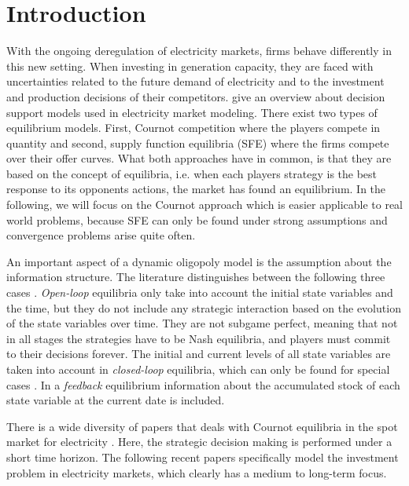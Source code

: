 \section{Introduction}

With the ongoing deregulation of electricity markets, firms behave differently in this new setting. When investing in generation capacity, they are faced with uncertainties related to the future demand of electricity and to the investment and production decisions of their competitors. \cite{Ventosa2005} give an overview about decision support models used in electricity market modeling. There exist two types of equilibrium models. First, Cournot competition where the players compete in quantity and second, supply function equilibria (SFE) where the firms compete over their offer curves. What both approaches have in common, is that they are based on the concept of \cite{Nash1951} equilibria, i.e. when each players strategy is the best response to its opponents actions, the market has found an equilibrium. In the following, we will focus on the Cournot approach which is easier applicable to real world problems, because SFE can only be found under strong assumptions and convergence problems arise quite often.

An important aspect of a dynamic oligopoly model is the assumption about the information structure. The literature distinguishes between the following three cases \citep[see, e.g.,][]{Cellini2004}. \emph{Open-loop} equilibria only take into account the initial state variables and the time, but they do not include any strategic interaction based on the evolution of the state variables over time. They are not subgame perfect, meaning that not in all stages the strategies have to be Nash equilibria, and players must commit to their decisions forever. The initial and current levels of all state variables are taken into account in \emph{closed-loop} equilibria, which can only be found for special cases \citep[see][]{Murphy2005}. In a \emph{feedback} equilibrium information about the accumulated stock of each state variable at the current date is included.

There is a wide diversity of papers that deals with Cournot equilibria in the spot market for electricity \citep[see, e.g.][]{Borenstein1999, Otero-Novas2000}. Here, the strategic decision making is performed under a short time horizon. The following recent papers specifically model the investment problem in electricity markets, which clearly has a medium to long-term focus.

